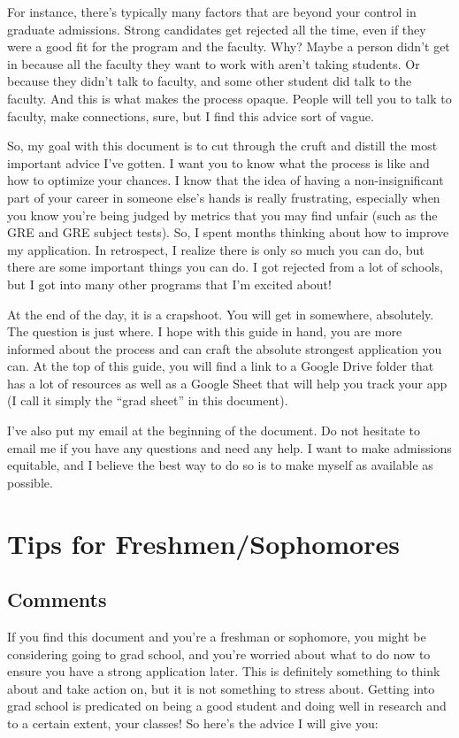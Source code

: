 \documentclass[12pt]{article}
\begin{document}
For instance, there's typically many factors that are beyond your control in graduate admissions. Strong candidates get rejected all the time, even if they were a good fit for the program and the faculty. Why? Maybe a person didn't get in because all the faculty they want to work with aren't taking students. Or because they didn't talk to faculty, and some other student did talk to the faculty. And this is what makes the process opaque. People will tell you to talk to faculty, make connections, sure, but I find this advice sort of vague.

So, my goal with this document is to cut through the cruft and distill the most important advice I've gotten. I want you to know what the process is like and how to optimize your chances. I know that the idea of having a non-insignificant part of your career in someone else's hands is really frustrating, especially when you know you're being judged by metrics that you may find unfair (such as the GRE and GRE subject tests). So, I spent months thinking about how to improve my application. In retrospect, I realize there is only so much you can do, but there are some important things you can do. I got rejected from a lot of schools, but I got into many other programs that I'm excited about! 

At the end of the day, it is a crapshoot. You will get in somewhere, absolutely. The question is just where. I hope with this guide in hand, you are more informed about the process and can craft the absolute strongest application you can. At the top of this guide, you will find a link to a Google Drive folder that has a lot of resources as well as a Google Sheet that will help you track your app (I call it simply the ``grad sheet'' in this document).

I've also put my email at the beginning of the document. Do not hesitate to email me if you have any questions and need any help. I want to make admissions equitable, and I believe the best way to do so is to make myself as available as possible.

\section{Tips for Freshmen/Sophomores}
\subsection{Comments}
If you find this document and you're a freshman or sophomore, you might be considering going to grad school, and you're worried about what to do now to ensure you have a strong application later. This is definitely something to think about and take action on, but it is not something to stress about. Getting into grad school is predicated on being a good student and doing well in research and to a certain extent, your classes! So here's the advice I will give you:
\end{document}
